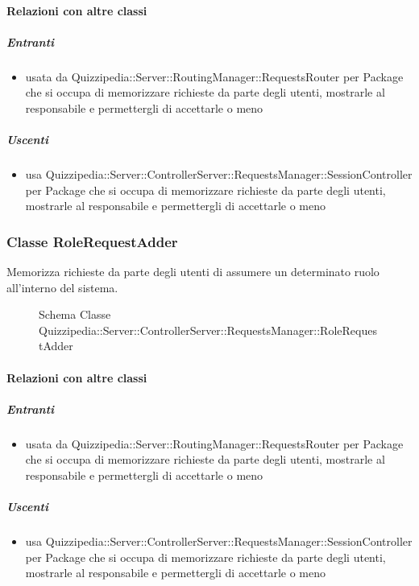 \paragraph{Relazioni con altre classi}
\subparagraph{Entranti}
\begin{itemize}
\item usata da Quizzipedia::Server::RoutingManager::RequestsRouter per Package che si occupa di memorizzare richieste da parte degli utenti, mostrarle al responsabile e permettergli di accettarle o meno
\end{itemize}
\subparagraph{Uscenti}
\begin{itemize}
\item usa Quizzipedia::Server::ControllerServer::RequestsManager::SessionController per Package che si occupa di memorizzare richieste da parte degli utenti, mostrarle al responsabile e permettergli di accettarle o meno
\end{itemize}
\subsubsection{Classe RoleRequestAdder}
Memorizza richieste da parte degli utenti di assumere un determinato ruolo all'interno del sistema.
\begin{figure}[H]
\centering
\noindent{}
\caption[Schema Classe RoleRequestAdder]{Schema Classe Quizzipedia::Server::ControllerServer::RequestsManager::RoleRequestAdder}
\end{figure}
\paragraph{Relazioni con altre classi}
\subparagraph{Entranti}
\begin{itemize}
\item usata da Quizzipedia::Server::RoutingManager::RequestsRouter per Package che si occupa di memorizzare richieste da parte degli utenti, mostrarle al responsabile e permettergli di accettarle o meno
\end{itemize}
\subparagraph{Uscenti}
\begin{itemize}
\item usa Quizzipedia::Server::ControllerServer::RequestsManager::SessionController per Package che si occupa di memorizzare richieste da parte degli utenti, mostrarle al responsabile e permettergli di accettarle o meno
\end{itemize}
